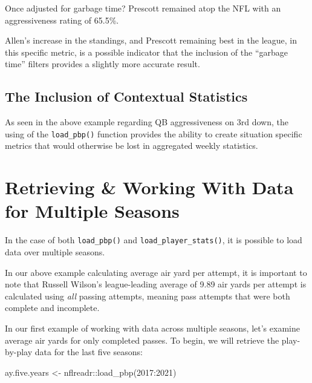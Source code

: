 \documentclass[
  letterpaper,
]{krantz}
\newenvironment{Shaded}{\begin{snugshade}}{\end{snugshade}}
\newcommand{\DecValTok}[1]{\textcolor[rgb]{0.68,0.00,0.00}{#1}}
\newcommand{\FunctionTok}[1]{\textcolor[rgb]{0.28,0.35,0.67}{#1}}
\newcommand{\NormalTok}[1]{\textcolor[rgb]{0.00,0.23,0.31}{#1}}
\newcommand{\OtherTok}[1]{\textcolor[rgb]{0.00,0.23,0.31}{#1}}
\newcommand{\SpecialCharTok}[1]{\textcolor[rgb]{0.37,0.37,0.37}{#1}}
\begin{document}
Once adjusted for garbage time? Prescott remained atop the NFL with an
aggressiveness rating of 65.5\%.

Allen's increase in the standings, and Prescott remaining best in the
league, in this specific metric, is a possible indicator that the
inclusion of the ``garbage time'' filters provides a slightly more
accurate result.

\hypertarget{the-inclusion-of-contextual-statistics}{%
\subsection{The Inclusion of Contextual
Statistics}\label{the-inclusion-of-contextual-statistics}}

As seen in the above example regarding QB aggressiveness on 3rd down,
the using of the \texttt{load\_pbp()} function provides the ability to
create situation specific metrics that would otherwise be lost in
aggregated weekly statistics.

\hypertarget{retrieving-working-with-data-for-multiple-seasons}{%
\section{Retrieving \& Working With Data for Multiple
Seasons}\label{retrieving-working-with-data-for-multiple-seasons}}

In the case of both \texttt{load\_pbp()} and
\texttt{load\_player\_stats()}, it is possible to load data over
multiple seasons.

In our above example calculating average air yard per attempt, it is
important to note that Russell Wilson's league-leading average of 9.89
air yards per attempt is calculated using \emph{all} passing attempts,
meaning pass attempts that were both complete and incomplete.

In our first example of working with data across multiple seasons, let's
examine average air yards for only completed passes. To begin, we will
retrieve the play-by-play data for the last five seasons:

\begin{Shaded}
\begin{Highlighting}[]
\NormalTok{ay.five.years }\OtherTok{\textless{}{-}}\NormalTok{ nflreadr}\SpecialCharTok{::}\FunctionTok{load\_pbp}\NormalTok{(}\DecValTok{2017}\SpecialCharTok{:}\DecValTok{2021}\NormalTok{)}
\end{Highlighting}
\end{Shaded}
\end{document}
